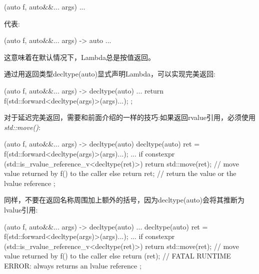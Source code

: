 \begin{cppcode}
[] (auto f, auto&&... args) {
	...
}
\end{cppcode}

代表:

\begin{cppcode}
[] (auto f, auto&&... args) -> auto {
	...
}
\end{cppcode}

这意味着在默认情况下，Lambda总是按值返回。

通过用返回类型decltype(auto)显式声明Lambda，可以实现完美返回:

\begin{cppcode}
[] (auto f, auto&&... args) -> decltype(auto) {
	...
	return f(std::forward<decltype(args)>(args)...);
};
\end{cppcode}

对于延迟完美返回，需要和前面介绍的一样的技巧:如果返回rvalue引用，必须使用\textit{std::move()}:

\begin{cppcode}
[] (auto f, auto&&... args) -> decltype(auto) {
	decltype(auto) ret = f(std::forward<decltype(args)>(args)...);
	...
	if constexpr (std::is_rvalue_reference_v<decltype(ret)>) {
		return std::move(ret); // move value returned by f() to the caller
	}
	else {
		return ret; // return the value or the lvalue reference
	}
};
\end{cppcode}

同样，不要在返回名称周围加上额外的括号，因为decltype(auto)会将其推断为lvalue引用:

\begin{cppcode}
[] (auto f, auto&&... args) -> decltype(auto) {
	...
	decltype(auto) ret = f(std::forward<decltype(args)>(args)...);
	...
	if constexpr (std::is_rvalue_reference_v<decltype(ret)>) {
		return std::move(ret); // move value returned by f() to the caller
	}
	else {
		return (ret); // FATAL RUNTIME ERROR: always returns an lvalue reference
	}
};
\end{cppcode}










